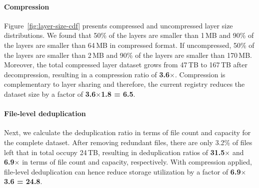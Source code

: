 %
%


%

\paragraph{Compression}
%
Figure~\ref{fig:layer-size-cdf} presents compressed and uncompressed layer size
distributions.
%
We found that 50\% of the layers are smaller than 1\,MB and 90\% of the layers are
smaller than 64\,MB in compressed format.
%
If uncompressed, 50\% of the layers are smaller than 2\,MB and 90\% of the
layers are smaller than 170\,MB.
%
Moreover, the total compressed layer dataset grows from 47\,TB to 167\,TB after
decompression, resulting in a compression ratio of \textbf{3.6$\times$}.
%
Compression is complementary to layer sharing and therefore, the current registry
reduces the dataset size by a factor of \textbf{3.6$\times$1.8 = 6.5}.


\paragraph{File-level deduplication}
%
%
Next, we calculate the deduplication ratio in terms of file count and capacity for
the complete dataset.
%
After removing redundant files, there are only 3.2\% of files left that in total occupy
24\,TB, resulting in deduplication ratios of \textbf{31.5$\times$} and
\textbf{6.9$\times$} in terms of file count and capacity, respectively.
%
With compression applied, file-level deduplication can hence reduce storage utilization
by a factor of \textbf{6.9$\times$3.6 = 24.8}.
%
%

